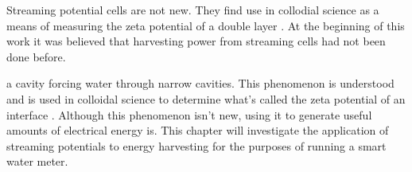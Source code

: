     Streaming potential cells are not new.
    They find use in collodial science as a means of measuring the zeta potential of a double layer \cite{Gu2000,Scales1992,Daiguji2004,VanderHeyden2006,Mala1997}.
    At the beginning of this work it was believed that harvesting power from streaming cells had not been done before.




    a cavity forcing water through narrow cavities. This phenomenon is understood
    and is used in colloidal science to determine what's called the zeta potential
    of an interface \cite{Gu2000,Scales1992,Daiguji2004,VanderHeyden2006,Mala1997}.
    Although this phenomenon isn't new, using it to generate useful amounts of
    electrical energy is. This chapter will investigate the application of
    streaming potentials to energy harvesting for the purposes of running a smart
    water meter.



